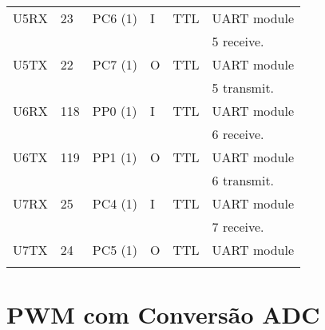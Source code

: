 \begin{table}[H]
\begin{tabular}{|l|l|l|l|l|l|}
\hline
U5RX & 23 & PC6 (1) & I & TTL & UART module  \\
 & & & & & 5 receive. \\
\hline
U5TX & 22 & PC7 (1) & O & TTL & UART module\\
 & & & & & 5 transmit. \\
\hline
U6RX & 118 & PP0 (1) & I & TTL & UART module\\
 & & & & &  6 receive. \\
\hline
U6TX & 119 & PP1 (1) & O & TTL & UART module\\
 & & & & &  6 transmit.\\
\hline
U7RX & 25 & PC4 (1) & I & TTL & UART module \\
 & & & & &  7 receive.\\
\hline
U7TX & 24 & PC5 (1) & O & TTL & UART module\\
 & & & & & \\
\hline
\end{tabular}
\end{table}



\section{PWM com Conversão ADC}

